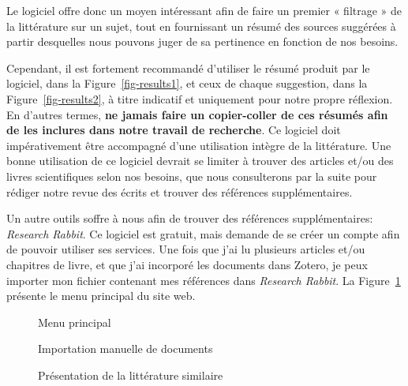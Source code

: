 \documentclass[
  letterpaper,
  DIV=11,
  numbers=noendperiod]{scrreprt}
\begin{document}
Le logiciel offre donc un moyen intéressant afin de faire un premier «
filtrage » de la littérature sur un sujet, tout en fournissant un résumé
des sources suggérées à partir desquelles nous pouvons juger de sa
pertinence en fonction de nos besoins.

Cependant, il est fortement recommandé d'utiliser le résumé produit par
le logiciel, dans la Figure~\ref{fig-results1}, et ceux de chaque
suggestion, dans la Figure~\ref{fig-results2}, à titre indicatif et
uniquement pour notre propre réflexion. En d'autres termes, \textbf{ne
jamais faire un copier-coller de ces résumés afin de les inclures dans
notre travail de recherche}. Ce logiciel doit impérativement être
accompagné d'une utilisation intègre de la littérature. Une bonne
utilisation de ce logiciel devrait se limiter à trouver des articles
et/ou des livres scientifiques selon nos besoins, que nous consulterons
par la suite pour rédiger notre revue des écrits et trouver des
références supplémentaires.

Un autre outils soffre à nous afin de trouver des références
supplémentaires: \emph{Research Rabbit}. Ce logiciel est gratuit, mais
demande de se créer un compte afin de pouvoir utiliser ses services. Une
fois que j'ai lu plusieurs articles et/ou chapitres de livre, et que
j'ai incorporé les documents dans Zotero, je peux importer mon fichier
contenant mes références dans \emph{Research Rabbit}. La
Figure~\ref{fig-rr1} présente le menu principal du site web.

\begin{figure}


\caption{\label{fig-rr1}Menu principal}

\end{figure}%

\begin{figure}


\caption{\label{fig-rr2}Importation manuelle de documents}

\end{figure}%

\begin{figure}


\caption{\label{fig-rr3}Présentation de la littérature similaire}

\end{figure}%
\end{document}
